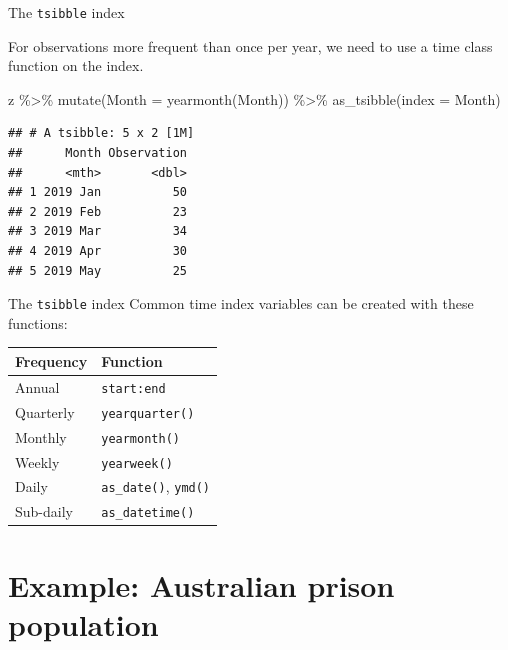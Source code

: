 \documentclass[14pt,ignorenonframetext,aspectratio=169]{beamer}
\newenvironment{Shaded}{\begin{snugshade}}{\end{snugshade}}
\newcommand{\AttributeTok}[1]{\textcolor[rgb]{0.77,0.63,0.00}{#1}}
\newcommand{\FunctionTok}[1]{\textcolor[rgb]{0.00,0.00,0.00}{#1}}
\newcommand{\NormalTok}[1]{#1}
\newcommand{\SpecialCharTok}[1]{\textcolor[rgb]{0.00,0.00,0.00}{#1}}
\renewenvironment{Shaded}{\color{black}\begin{snugshade}\color{black}}{\end{snugshade}}
\renewenvironment{Shaded}{\color{black}\fontsize{10}{10}\sf\begin{snugshade}\color{black}}{\end{snugshade}}
\begin{document}
\begin{frame}[fragile]{The \texttt{tsibble} index}
\protect\hypertarget{the-tsibble-index-3}{}
\begin{block}{}
For observations more frequent than once per year, we need to use a time class function on the index.
\end{block}
\fontsize{12}{13}\sf

\begin{Shaded}
\begin{Highlighting}[]
\NormalTok{z }\SpecialCharTok{\%\textgreater{}\%}
  \FunctionTok{mutate}\NormalTok{(}\AttributeTok{Month =} \FunctionTok{yearmonth}\NormalTok{(Month)) }\SpecialCharTok{\%\textgreater{}\%}
  \FunctionTok{as\_tsibble}\NormalTok{(}\AttributeTok{index =}\NormalTok{ Month)}
\end{Highlighting}
\end{Shaded}

\begin{verbatim}
## # A tsibble: 5 x 2 [1M]
##      Month Observation
##      <mth>       <dbl>
## 1 2019 Jan          50
## 2 2019 Feb          23
## 3 2019 Mar          34
## 4 2019 Apr          30
## 5 2019 May          25
\end{verbatim}
\end{frame}

\begin{frame}[fragile]{The \texttt{tsibble} index}
\protect\hypertarget{the-tsibble-index-4}{}
Common time index variables can be created with these functions:

\begin{block}{}
\protect\hypertarget{section}{}
\begin{longtable}[]{@{}ll@{}}
\toprule
Frequency & Function \\
\midrule
\endhead
Annual & \texttt{start:end} \\
Quarterly & \texttt{yearquarter()} \\
Monthly & \texttt{yearmonth()} \\
Weekly & \texttt{yearweek()} \\
Daily & \texttt{as\_date()}, \texttt{ymd()} \\
Sub-daily & \texttt{as\_datetime()} \\
\bottomrule
\end{longtable}
\end{block}
\end{frame}

\hypertarget{example-australian-prison-population}{%
\section{Example: Australian prison
population}\label{example-australian-prison-population}}
\end{document}
